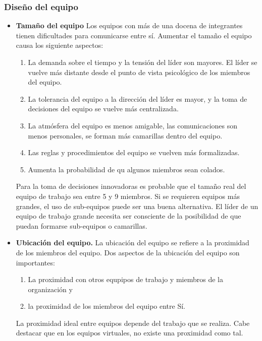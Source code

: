 \subsubsection{Diseño del equipo}

\begin{itemize}
    \item \textbf{Tamaño del equipo}  Los equipos con más de una docena
    de integrantes tienen dificultades para comunicarse entre sí.
    Aumentar el tamaño el equipo causa los siguiente aspectos:

    \begin{enumerate}
        \item La demanda sobre el tiempo y la tensión del líder son mayores. El líder se vuelve más distante desde el punto de vista psicológico de los miembros del equipo.
        \item La tolerancia del equipo a la dirección del líder es mayor, y la toma de decisiones del equipo se vuelve más centralizada.
        \item La atmósfera del equipo es menos amigable, las comunicaciones son menos personales, se forman más camarillas dentro del equipo.
        \item Las reglas y procedimientos del equipo se vuelven más formalizadas.
        \item Aumenta la probabilidad de qu algunos miembros sean colados.
    \end{enumerate}
    
    Para la toma de decisiones innovadoras es probable que el tamaño real
    del equipo de trabajo sea entre 5 y 9 miembros. Si se requieren
    equipos más grandes, el uso de sub-equipos puede ser una buena
    alternativa. El líder de un equipo de trabajo grande necesita ser
    consciente de la posibilidad de que puedan formarse sub-equipos o
    camarillas.

    \item \textbf{Ubicación del equipo.} La ubicación del equipo se
    refiere a la proximidad de los miembros del equipo. Dos aspectos de
    la ubicación del equipo son importantes:
    \begin{enumerate}
        \item La proximidad con otros equpipos de trabajo y miembros
        de la organización y
        \item la proximidad de los miembros del equipo entre Sí.
    \end{enumerate}
    La proximidad ideal entre equipos depende del trabajo que se realiza.
    Cabe destacar que en los equipos virtuales, no existe una proximidad
    como tal.


\end{itemize}
